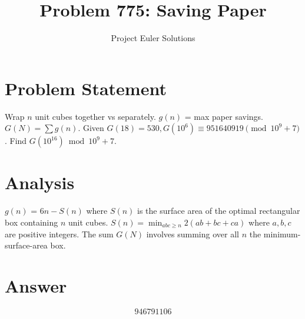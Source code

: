 \documentclass[11pt]{article}
\title{Problem 775: Saving Paper}
\author{Project Euler Solutions}
\date{}
\begin{document}
\maketitle


\section{Problem Statement}
Wrap $n$ unit cubes together vs separately. $g(n)$ = max paper savings. $G(N)=\sum g(n)$. Given $G(18)=530, G(10^6)\equiv 951640919 \pmod{10^9+7}$. Find $G(10^{{16}}) \bmod 10^9+7$.

\section{Analysis}
$g(n)$ = $6n - S(n)$ where $S(n)$ is the surface area of the optimal rectangular box containing $n$ unit cubes. $S(n) = \min_{{abc\ge n}} 2(ab+bc+ca)$ where $a,b,c$ are positive integers. The sum $G(N)$ involves summing over all $n$ the minimum-surface-area box.

\section{Answer}

\[
\boxed{946791106}
\]
\end{document}
